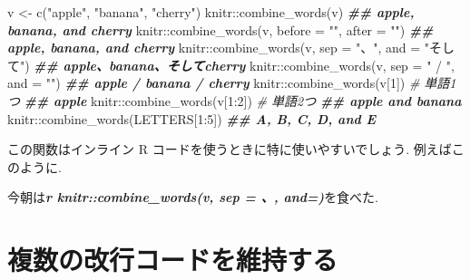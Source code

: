 \documentclass[
  11pt,
  lualatex,ja=standard,jafont=noto]{bxjsreport}
\newenvironment{Shaded}{\begin{snugshade}}{\end{snugshade}}
\newcommand{\AttributeTok}[1]{\textcolor[rgb]{0.77,0.63,0.00}{#1}}
\newcommand{\CommentTok}[1]{\textcolor[rgb]{0.56,0.35,0.01}{\textit{#1}}}
\newcommand{\DecValTok}[1]{\textcolor[rgb]{0.00,0.00,0.81}{#1}}
\newcommand{\DocumentationTok}[1]{\textcolor[rgb]{0.56,0.35,0.01}{\textbf{\textit{#1}}}}
\newcommand{\FunctionTok}[1]{\textcolor[rgb]{0.00,0.00,0.00}{#1}}
\newcommand{\InformationTok}[1]{\textcolor[rgb]{0.56,0.35,0.01}{\textbf{\textit{#1}}}}
\newcommand{\NormalTok}[1]{#1}
\newcommand{\OtherTok}[1]{\textcolor[rgb]{0.56,0.35,0.01}{#1}}
\newcommand{\SpecialCharTok}[1]{\textcolor[rgb]{0.00,0.00,0.00}{#1}}
\newcommand{\StringTok}[1]{\textcolor[rgb]{0.31,0.60,0.02}{#1}}
\begin{document}
\begin{Shaded}
\begin{Highlighting}[numbers=left,,]
\NormalTok{v }\OtherTok{\textless{}{-}} \FunctionTok{c}\NormalTok{(}\StringTok{"apple"}\NormalTok{, }\StringTok{"banana"}\NormalTok{, }\StringTok{"cherry"}\NormalTok{)}
\NormalTok{knitr}\SpecialCharTok{::}\FunctionTok{combine\_words}\NormalTok{(v)}
\DocumentationTok{\#\# apple, banana, and cherry}
\NormalTok{knitr}\SpecialCharTok{::}\FunctionTok{combine\_words}\NormalTok{(v, }\AttributeTok{before =} \StringTok{"\textasciigrave{}"}\NormalTok{, }\AttributeTok{after =} \StringTok{"\textquotesingle{}"}\NormalTok{)}
\DocumentationTok{\#\# \textasciigrave{}apple\textquotesingle{}, \textasciigrave{}banana\textquotesingle{}, and \textasciigrave{}cherry\textquotesingle{}}
\NormalTok{knitr}\SpecialCharTok{::}\FunctionTok{combine\_words}\NormalTok{(v, }\AttributeTok{sep =} \StringTok{"、"}\NormalTok{, }\AttributeTok{and =} \StringTok{"そして"}\NormalTok{)}
\DocumentationTok{\#\# apple、banana、そしてcherry}
\NormalTok{knitr}\SpecialCharTok{::}\FunctionTok{combine\_words}\NormalTok{(v, }\AttributeTok{sep =} \StringTok{" / "}\NormalTok{, }\AttributeTok{and =} \StringTok{""}\NormalTok{)}
\DocumentationTok{\#\# apple / banana / cherry}
\NormalTok{knitr}\SpecialCharTok{::}\FunctionTok{combine\_words}\NormalTok{(v[}\DecValTok{1}\NormalTok{])  }\CommentTok{\# 単語1つ}
\DocumentationTok{\#\# apple}
\NormalTok{knitr}\SpecialCharTok{::}\FunctionTok{combine\_words}\NormalTok{(v[}\DecValTok{1}\SpecialCharTok{:}\DecValTok{2}\NormalTok{])  }\CommentTok{\# 単語2つ}
\DocumentationTok{\#\# apple and banana}
\NormalTok{knitr}\SpecialCharTok{::}\FunctionTok{combine\_words}\NormalTok{(LETTERS[}\DecValTok{1}\SpecialCharTok{:}\DecValTok{5}\NormalTok{])}
\DocumentationTok{\#\# A, B, C, D, and E}
\end{Highlighting}
\end{Shaded}

この関数はインライン R コードを使うときに特に使いやすいでしょう. 例えばこのように.

\begin{Shaded}
\begin{Highlighting}[]
\NormalTok{今朝は}\InformationTok{\textasciigrave{}r knitr::combine\_words(v, sep = \textquotesingle{}、\textquotesingle{}, and=\textquotesingle{}\textquotesingle{})\textasciigrave{}}\NormalTok{を食べた.}
\end{Highlighting}
\end{Shaded}

\hypertarget{linebreaks}{%
\section{複数の改行コードを維持する}\label{linebreaks}}
\end{document}
